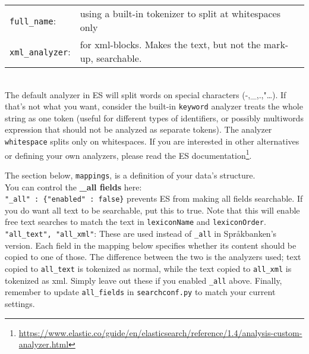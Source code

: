\documentclass[
12pt, %
a4paper, %
oneside, %
headinclude,footinclude, %
BCOR0mm, %
]{scrartcl}
\begin{document}
  \begin{tabular}{ll}
    \verb|full_name|: & using a built-in tokenizer to split at whitespaces only\\
    \verb|xml_analyzer|: & for xml-blocks. Makes the text, but not the mark-up, searchable.\\
   \end{tabular}\\


  The default analyzer in ES will split words on special characters (-,\_,.,"\ldots). If that's
  not what you want, consider the built-in
  \verb|keyword| analyzer treats the whole string as one token (useful for
  different types of identifiers, or possibly multiwords expression that should not be analyzed as
  separate tokens). The analyzer \verb|whitespace| splits only on whitespaces.
  If you are interested in other alternatives or defining your own analyzers,
  please read the ES documentation\footnote{%
 \url{https://www.elastic.co/guide/en/elasticsearch/reference/1.4/analysis-custom-analyzer.html}}.

  The section below, \verb|mappings|, is a definition of your data's structure. \\
  You can control
  the \textbf{\_all fields} here:\\
  \verb|"_all" : {"enabled" : false}|
  prevents ES from making all fields searchable.
  If you do want all text to be searchable, put this to true.
  Note that this will enable free text searches to
  match the text in  \verb|lexiconName| and \verb|lexiconOrder|.\\
  \verb|"all_text", "all_xml"|:
     These are used instead of \verb|_all| in Språkbanken's version. Each field in the mapping below
     specifies whether its content should be copied to one of those. The
     difference between the two is the analyzers used; text copied to \verb|all_text| is
     tokenized as normal, while the text copied to \verb|all_xml| is
     tokenized as xml. Simply leave out these if you enabled \verb|_all| above.
  Finally, remember to update \verb|all_fields| in \verb|searchconf.py|
  to match your current settings.
\end{document}
